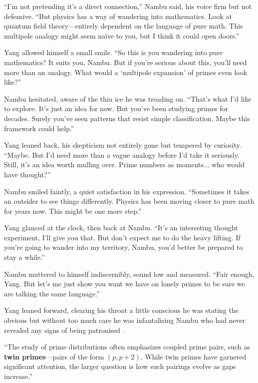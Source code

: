 “I’m not pretending it’s a direct connection,” Nambu said, his voice firm but not defensive. “But physics has a way of wandering into mathematics. Look at quantum field theory—entirely dependent on the language of pure math. This multipole analogy might seem naïve to you, but I think it could open doors.”
\smallskip

Yang allowed himself a small smile. “So this is you wandering into pure mathematics? It suits you, Nambu. But if you’re serious about this, you’ll need more than an analogy. What would a ‘multipole expansion’ of primes even look like?”
\smallskip

Nambu hesitated, aware of the thin ice he was treading on. “That’s what I’d like to explore. It’s just an idea for now. But you’ve been studying primes for decades. Surely you’ve seen patterns that resist simple classification. Maybe this framework could help.”
\smallskip

Yang leaned back, his skepticism not entirely gone but tempered by curiosity. “Maybe. But I’d need more than a vague analogy before I’d take it seriously. Still, it’s an idea worth mulling over. Prime numbers as moments... who would have thought?”
\smallskip

Nambu smiled faintly, a quiet satisfaction in his expression. “Sometimes it takes an outsider to see things differently. Physics has been moving closer to pure math for years now. This might be one more step.”
\smallskip

Yang glanced at the clock, then back at Nambu. “It’s an interesting thought experiment, I’ll give you that. But don’t expect me to do the heavy lifting. If you’re going to wander into my territory, Nambu, you’d better be prepared to stay a while.”
\smallskip

Nambu muttered to himself indiscernibly, sound low and measured. “Fair enough, Yang. But let’s me just show you want we have on lonely primes to be sure we are talking the same language.”
\smallskip

Yang leaned forward, clearing his throat a little conscious he was stating the obvious but without too much care he was infantalising Nambu who had never revealed any signs of being patronised  . 
\smallskip

``The study of prime distributions often emphasizes coupled prime pairs, such as \textbf{twin primes}—pairs of the form 
\((p, p+2)\). While twin primes have garnered significant attention, the larger question is how such pairings evolve as gaps increase.''
\smallskip

